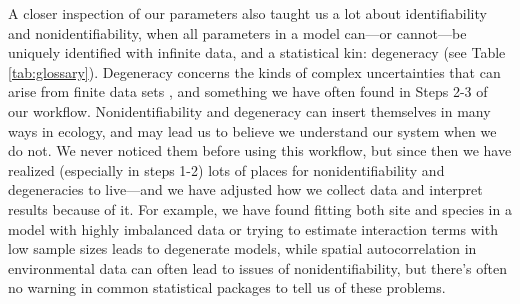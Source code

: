 \documentclass[11pt]{article}
\begin{document}
A closer inspection of our parameters also taught us a lot about identifiability and nonidentifiability, when all parameters in a model can---or cannot---be uniquely identified with infinite data, and a statistical kin: degeneracy (see Table \ref{tab:glossary}).  Degeneracy concerns the kinds of complex uncertainties that can arise from finite data sets \citep{gelmanhill}, and something we have often found in Steps 2-3 of our workflow.
Nonidentifiability and degeneracy can insert themselves in many ways in ecology, and may lead us to believe we understand our system when we do not. We never noticed them before using this workflow, but since then we have realized (especially in steps 1-2) lots of places for nonidentifiability and degeneracies to live---and we have adjusted how we collect data and interpret results because of it. For example, we have found fitting both site and species in a model with highly imbalanced data or trying to estimate interaction terms with low sample sizes \citep[for more details see][]{regotherstories} leads to degenerate models, while spatial autocorrelation in environmental data can often lead to issues of nonidentifiability, but there's often no warning in common statistical packages to tell us of these problems. 

\end{document}
